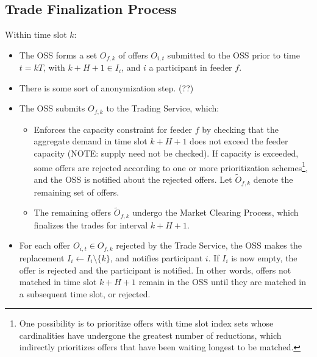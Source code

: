 \subsection{Trade Finalization Process}
Within time slot $k$:
\begin{itemize}
\item The OSS forms a set $O_{f,k}$ of offers $O_{i,t}$ submitted to the OSS prior to time $t=kT$, with $k+H+1\in I_i$, and $i$ a participant in feeder $f$. 
\item There is some sort of anonymization step. (??)
\item The OSS submits $O_{f,k}$ to the Trading Service, which:
\begin{itemize}
\item Enforces the capacity constraint for feeder $f$ by checking that the aggregate demand in time slot $k+H+1$ does not exceed the feeder capacity (NOTE: supply need not be  checked). If capacity is exceeded, some offers are rejected according to one or more prioritization schemes\footnote{One possibility is to prioritize offers with time slot index sets whose cardinalities have undergone the greatest number of reductions, which indirectly prioritizes offers that have been waiting longest to be matched.}, and the OSS is notified about the rejected offers. Let $\tilde{O}_{f,k}$ denote the remaining set of offers.
\item The remaining offers $\tilde{O}_{f,k}$ undergo the Market Clearing Process, which finalizes the trades for interval $k+H+1$.
\end{itemize}
\item For each offer $O_{i,t}\in O_{f,k}$ rejected by the Trade 
 Service, the OSS makes the replacement $I_i\leftarrow I_i \setminus \{k\}$, and notifies participant $i$. If $I_i$ is now empty, the offer is rejected and the participant is notified. In other words, offers not matched in time slot $k+H+1$ remain in the OSS until they are matched in a subsequent time slot, or rejected.  
\end{itemize}





